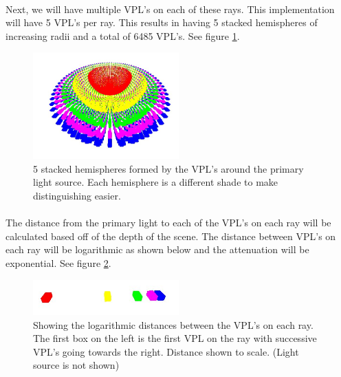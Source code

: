 \paragraph{}
Next, we will have multiple VPL's on each of these rays.  This implementation will have 5 VPL's per ray.  This results in having 5 stacked hemispheres of increasing radii and a total of 6485 VPL's. See figure \ref{fig:3.4}.

\begin{figure}[h!]
  \centering
    \includegraphics[width=0.5\textwidth]{Figure34.jpg}
  \caption{5 stacked hemispheres formed by the VPL's around the primary light source. Each hemisphere is a different shade to make distinguishing easier.}
	\label{fig:3.4}
\end{figure}

\paragraph{}
The distance from the primary light to each of the VPL's on each ray will be calculated based off of the depth of the scene.  The distance between VPL's on each ray will be logarithmic as shown below and the attenuation will be exponential.  See figure \ref{fig:3.5}.

\begin{figure}[h!]
  \centering
    \includegraphics[width=0.5\textwidth]{Figure35.jpg}
  \caption{Showing the logarithmic distances between the VPL's on each ray.  The first box on the left is the first VPL on the ray with successive VPL's going towards the right. Distance shown to scale. (Light source is not shown)}
	\label{fig:3.5}
\end{figure}

